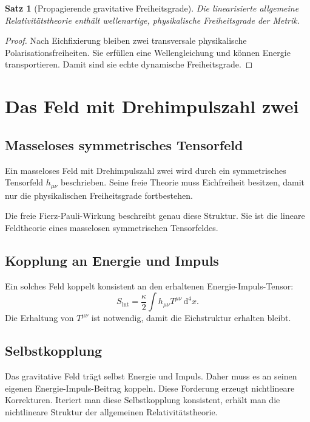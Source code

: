 \documentclass[11pt,a4paper,openany]{book}
\newtheorem{satz}{Satz}[chapter]
\theoremstyle{remark}
\newcommand{\diff}{\mathrm{d}}
\begin{document}
\begin{satz}[Propagierende gravitative Freiheitsgrade]
Die linearisierte allgemeine Relativitätstheorie enthält wellenartige, physikalische Freiheitsgrade der Metrik.
\end{satz}
\begin{proof}
Nach Eichfixierung bleiben zwei transversale physikalische Polarisationsfreiheiten. Sie erfüllen eine Wellengleichung und können Energie transportieren. Damit sind sie echte dynamische Freiheitsgrade.
\end{proof}

\chapter{Das Feld mit Drehimpulszahl zwei}
\section{Masseloses symmetrisches Tensorfeld}
Ein masseloses Feld mit Drehimpulszahl zwei wird durch ein symmetrisches Tensorfeld $h_{\mu\nu}$ beschrieben. Seine freie Theorie muss Eichfreiheit besitzen, damit nur die physikalischen Freiheitsgrade fortbestehen.

Die freie Fierz-Pauli-Wirkung beschreibt genau diese Struktur. Sie ist die lineare Feldtheorie eines masselosen symmetrischen Tensorfeldes.

\section{Kopplung an Energie und Impuls}
Ein solches Feld koppelt konsistent an den erhaltenen Energie-Impuls-Tensor:
\begin{equation}
S_{\mathrm{int}}=\frac{\kappa}{2}\int h_{\mu\nu}T^{\mu\nu}\,\diff^4x.
\end{equation}
Die Erhaltung von $T^{\mu\nu}$ ist notwendig, damit die Eichstruktur erhalten bleibt.

\section{Selbstkopplung}
Das gravitative Feld trägt selbst Energie und Impuls. Daher muss es an seinen eigenen Energie-Impuls-Beitrag koppeln. Diese Forderung erzeugt nichtlineare Korrekturen. Iteriert man diese Selbstkopplung konsistent, erhält man die nichtlineare Struktur der allgemeinen Relativitätstheorie.
\end{document}
